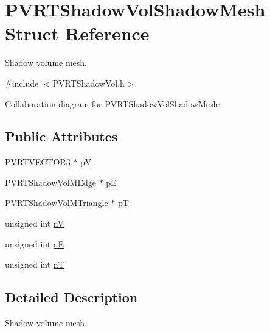 \hypertarget{struct_p_v_r_t_shadow_vol_shadow_mesh}{\section{P\+V\+R\+T\+Shadow\+Vol\+Shadow\+Mesh Struct Reference}
\label{struct_p_v_r_t_shadow_vol_shadow_mesh}
}


Shadow volume mesh.  




{\ttfamily \#include $<$P\+V\+R\+T\+Shadow\+Vol.\+h$>$}



Collaboration diagram for P\+V\+R\+T\+Shadow\+Vol\+Shadow\+Mesh\+:
\subsection*{Public Attributes}
\begin{DoxyCompactItemize}
\item 
\hyperlink{struct_p_v_r_t_v_e_c_t_o_r3f}{P\+V\+R\+T\+V\+E\+C\+T\+O\+R3} $\ast$ \hyperlink{struct_p_v_r_t_shadow_vol_shadow_mesh_a3fc4b970254d1a29eff50bd80f30f2b0}{p\+V}
\item 
\hyperlink{struct_p_v_r_t_shadow_vol_m_edge}{P\+V\+R\+T\+Shadow\+Vol\+M\+Edge} $\ast$ \hyperlink{struct_p_v_r_t_shadow_vol_shadow_mesh_aa8d63a37fc810362bc8e092ca9c6fdf5}{p\+E}
\item 
\hyperlink{struct_p_v_r_t_shadow_vol_m_triangle}{P\+V\+R\+T\+Shadow\+Vol\+M\+Triangle} $\ast$ \hyperlink{struct_p_v_r_t_shadow_vol_shadow_mesh_a57f94bc313dba2fa260edffa83c9f4f9}{p\+T}
\item 
unsigned int \hyperlink{struct_p_v_r_t_shadow_vol_shadow_mesh_ad544c76448e3990c1383b6236a302e71}{n\+V}
\item 
unsigned int \hyperlink{struct_p_v_r_t_shadow_vol_shadow_mesh_a3cd121dcb7b62a9bc0234c08f94a1cda}{n\+E}
\item 
unsigned int \hyperlink{struct_p_v_r_t_shadow_vol_shadow_mesh_a35e421c0b2614b6745cc22addc1ad66a}{n\+T}
\end{DoxyCompactItemize}


\subsection{Detailed Description}
Shadow volume mesh. 



 

